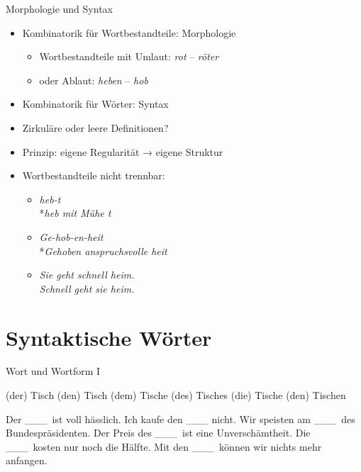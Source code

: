 \begin{frame}
  {Morphologie und Syntax}
  \pause
  \begin{itemize}[<+->]
    \item Kombinatorik für \alert{Wortbestandteile}: Morphologie
      \begin{itemize}[<+->]
        \item Wortbestandteile \zB mit \alert{Umlaut}: \textit{rot} -- \textit{röter}
        \item oder \alert{Ablaut}: \textit{heben} -- \textit{hob}
      \end{itemize}
    \item Kombinatorik für \alert{Wörter}: Syntax
      \Zeile
    \item \alert{Zirkuläre oder leere Definitionen?}
    \item {} Prinzip: eigene Regularität → eigene Struktur
      \Zeile
    \item Wortbestandteile \alert{nicht trennbar}:
      \begin{itemize}
        \item \textit{heb-t}\\
          *\textit{heb mit Mühe t}
        \item \textit{Ge-hob-en-heit} \\
          *\textit{Gehoben anspruchsvolle heit}
        \item \textit{Sie geht schnell heim.}\\
          \textit{Schnell geht sie heim.}
      \end{itemize}
  \end{itemize}
\end{frame}



\section{Syntaktische Wörter}

\begin{frame}
  {Wort und Wortform I}
  \pause
  \begin{exe}
    \ex
    \begin{xlist}
      \ex (der) Tisch
      \pause
      \ex (den) Tisch
      \pause
      \ex (dem) Tisch\alert{e}
      \pause
      \ex (des) Tisch\alert{es}
      \pause
      \ex (die) Tisch\alert{e}
      \pause
      \ex (den) Tisch\alert{en}
    \end{xlist}
  \end{exe}
  \pause
  \begin{exe}
    \ex
    \begin{xlist}
      \ex Der \_\_\_\ ist voll hässlich.
      \pause
      \ex Ich kaufe den \_\_\_ nicht.
      \pause
      \ex Wir speisten am \_\_\_\ des Bundespräsidenten.
      \pause
      \ex Der Preis des \_\_\_\ ist eine Unverschämtheit.
      \pause
      \ex Die \_\_\_\ kosten nur noch die Hälfte.
      \pause
      \ex Mit den \_\_\_\ können wir nichts mehr anfangen.
    \end{xlist}
  \end{exe}
\end{frame}

